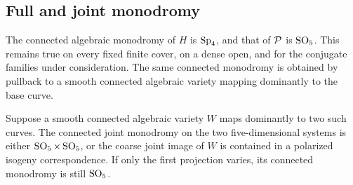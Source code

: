 \subsection{Full and joint monodromy}

\begin{proposition}\label{geo:monodromy}
The connected algebraic monodromy of $H$ is $\operatorname{Sp}_4$, and that of
$\mathcal P$ is $\operatorname{SO}_5$.  This remains true on every fixed finite cover,
on a dense open, and for the conjugate families under consideration.
The same connected monodromy is obtained by pullback to a smooth
connected algebraic variety mapping dominantly to the base curve.

Suppose a smooth connected algebraic variety $W$ maps dominantly to
two such curves.  The connected joint monodromy on the two
five-dimensional systems is either $\operatorname{SO}_5\times\operatorname{SO}_5$, or the
coarse joint image of $W$ is contained in a polarized isogeny
correspondence.  If only the first projection varies, its connected
monodromy is still $\operatorname{SO}_5$.
\end{proposition}

